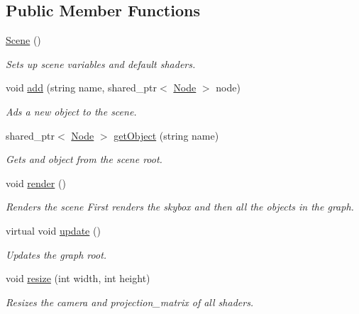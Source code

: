 \subsection*{Public Member Functions}
\begin{DoxyCompactItemize}
\item 
\mbox{\hyperlink{classoglsl_1_1_scene_a1d13c881f3b0b7d4d7bd8d5225a50481}{Scene}} ()
\begin{DoxyCompactList}\small\item\em Sets up scene variables and default shaders. \end{DoxyCompactList}\item 
void \mbox{\hyperlink{classoglsl_1_1_scene_a1b1296aab1c81101473a38451c139819}{add}} (string name, shared\+\_\+ptr$<$ \mbox{\hyperlink{classoglsl_1_1_node}{Node}} $>$ node)
\begin{DoxyCompactList}\small\item\em Ads a new object to the scene. \end{DoxyCompactList}\item 
shared\+\_\+ptr$<$ \mbox{\hyperlink{classoglsl_1_1_node}{Node}} $>$ \mbox{\hyperlink{classoglsl_1_1_scene_a10b398b3e59b41c5fb0dbadb8120e0f3}{get\+Object}} (string name)
\begin{DoxyCompactList}\small\item\em Gets and object from the scene root. \end{DoxyCompactList}\item 
void \mbox{\hyperlink{classoglsl_1_1_scene_a94b552369f7653c854d38a1553c84288}{render}} ()
\begin{DoxyCompactList}\small\item\em Renders the scene First renders the skybox and then all the objects in the graph. \end{DoxyCompactList}\item 
virtual void \mbox{\hyperlink{classoglsl_1_1_scene_accbf0c6f23ccd909f63851c0bc547449}{update}} ()
\begin{DoxyCompactList}\small\item\em Updates the graph root. \end{DoxyCompactList}\item 
void \mbox{\hyperlink{classoglsl_1_1_scene_a1eac687cef62ac021bfdd98749aa2ee5}{resize}} (int width, int height)
\begin{DoxyCompactList}\small\item\em Resizes the camera and projection\+\_\+matrix of all shaders. \end{DoxyCompactList}\item 

\end{DoxyCompactItemize}
